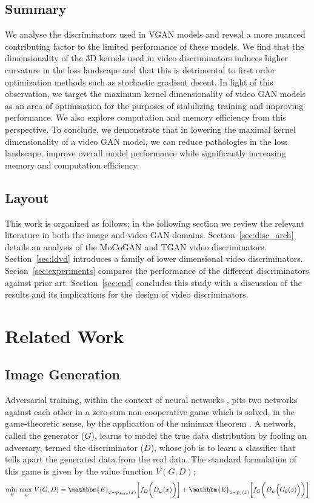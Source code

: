 \documentclass[a4paper,fleqn]{cas-sc}
\begin{document}
\subsection{Summary}
We analyse the discriminators used in VGAN models and reveal a more nuanced contributing factor to the limited performance of these models. We find that the dimensionality of the 3D kernels used in video discriminators induces higher curvature in the loss landscape and that this is detrimental to first order optimization methods such as stochastic gradient decent. In light of this observation, we target the maximum kernel dimensionality of video GAN models as an area of optimisation for the purposes of stabilizing training and improving performance. We also explore computation and memory efficiency from this perspective. To conclude, we demonstrate that in lowering the maximal kernel dimensionality of a video GAN model, we can reduce pathologies in the loss landscape, improve overall model performance while significantly increasing memory and computation efficiency.


\subsection{Layout}
This work is organized as follows; in the following section we review the relevant literature in both the image and video GAN domains. Section~\ref{sec:disc_arch} details an analysis of the MoCoGAN and TGAN video discriminators. Section~\ref{sec:ldvd} introduces a family of lower dimensional video discriminators. Secion~\ref{sec:experiments} compares the performance of the different discriminators against prior art. Section~\ref{sec:end} concludes this study with a discussion of the results and its implications for the design of video discriminators.


\section{Related Work}
\label{sec:related}
\subsection{Image Generation}
Adversarial training, within the context of neural networks \cite{GoodfellowPMXWOCB14generative}, pits two networks against each other in a zero-sum non-cooperative game which is solved, in the game-theoretic sense, by the application of the minimax theorem \cite{vNeumann1928}. A network, called the generator ($G$), learns to model the true data distribution by fooling an adversary, termed the discriminator ($D$), whose job is to learn a classifier that tells apart the generated data from the real data. The standard formulation of this game is given by the value function $V(G, D)$;
\begin{equation}
    \underset{\theta}{\text{min }}  
    \underset{\psi}{\text{max }} V(G, D) = \mathbbm{E}_{x \sim  p_{data}(x)}\bigg[f_D\bigg(D_\psi(x)\bigg)\bigg] + 
    \mathbbm{E}_{z \sim  p_z(z)}\bigg[f_G\bigg(D_\psi\Big(G_\theta(z)\Big)\bigg)\bigg]
    \label{eq:gan_minmax}
\end{equation}
\end{document}
